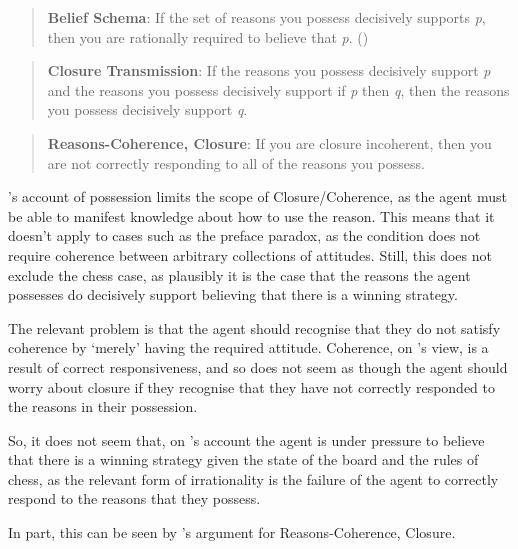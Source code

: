 \documentclass[10pt]{article}
\begin{document}
\begin{quote}
  \textbf{Belief Schema}: If the set of reasons you possess decisively supports \emph{p}, then you are rationally required to believe that \emph{p}.\nolinebreak
  \mbox{}\hfill\mbox{(\citeyear[28]{Lord:2018aa})}
\end{quote}

\begin{quote}
  \textbf{Closure Transmission}: If the reasons you possess decisively support \emph{p} and the reasons you possess decisively support if \emph{p} then \emph{q}, then the reasons you possess decisively support \emph{q}.
\end{quote}

\begin{quote}
  \textbf{Reasons-Coherence, Closure}: If you are closure incoherent, then you are not correctly responding to all of the reasons you possess.
\end{quote}

\citeauthor{Lord:2018aa}'s account of possession limits the scope of Closure/Coherence, as the agent must be able to manifest knowledge about how to use the reason.
This means that it doesn't apply to cases such as the preface paradox, as the condition does not require coherence between arbitrary collections of attitudes.
Still, this does not exclude the chess case, as plausibly it is the case that the reasons the agent possesses do decisively support believing that there is a winning strategy.

The relevant problem is that the agent should recognise that they do not satisfy coherence by `merely' having the required attitude.
Coherence, on \citeauthor{Lord:2018aa}'s view, is a result of correct responsiveness, and so does not seem as though the agent should worry about closure if they recognise that they have not correctly responded to the reasons in their possession.

So, it does not seem that, on \citeauthor{Lord:2018aa}'s account the agent is under pressure to believe that there is a winning strategy given the state of the board and the rules of chess, as the relevant form of irrationality is the failure of the agent to correctly respond to the reasons that they possess.

In part, this can be seen by \citeauthor{Lord:2018aa}'s argument for Reasons-Coherence, Closure.
\end{document}
